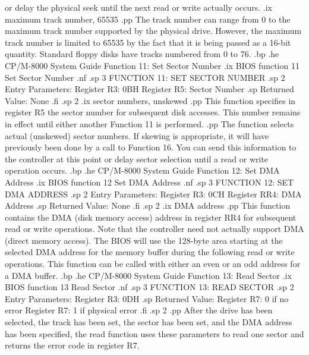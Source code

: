 or delay the physical seek until the next read or write actually occurs.
.ix maximum track number, 65535
.pp
The track number can range from 0 to the maximum track number supported
by the physical drive.  However, the maximum track number is limited
to 65535 by the fact that it is being passed as a 16-bit quantity.
Standard floppy disks have tracks numbered from 0 to 76.
.bp
.he CP/M-8000 System Guide             Function 11:  Set Sector Number
.ix BIOS function 11 Set Sector Number
.nf
.sp 3
                 FUNCTION 11:  SET SECTOR NUMBER
.sp 2 
                 Entry Parameters:
                    Register R3: 0BH
                    Register R5: Sector Number
.sp
                 Returned   Value: None
.fi
.sp 2
.ix sector numbers, unskewed
.pp
This function specifies in register R5 the sector number for subsequent disk
accesses.  This number remains in effect until either another Function 11 is 
performed.
.pp
The function selects actual (unskewed) sector numbers.  If skewing is 
appropriate, it will have previously been done by a call to Function 16.
You can send this information to the controller at this point or delay sector 
selection until a read or write operation occurs.
.bp
.he CP/M-8000 System Guide               Function 12:  Set DMA Address
.ix BIOS function 12 Set DMA Address
.nf
.sp 3
                  FUNCTION 12:  SET DMA ADDRESS
.sp 2
                  Entry Parameters:
                     Register R3: 0CH
                     Register RR4: DMA Address
.sp
                  Returned   Value: None
.fi
.sp 2
.ix DMA address
.pp
This function contains the DMA (disk memory access) address in register
RR4 for subsequent read or write operations.  Note that the controller
need not actually support DMA (direct memory access).  The BIOS will use
the 128-byte area starting at the selected DMA address
for the memory buffer during the following read or write operations.
This function can be called with either
an even or an odd address for a DMA buffer.
.bp
.he CP/M-8000 System Guide                   Function 13:  Read Sector
.ix BIOS function 13 Read Sector
.nf
.sp 3
                    FUNCTION 13:  READ SECTOR
.sp 2 
              Entry Parameters:    
                 Register R3: 0DH
.sp
              Returned   Value:  
                 Register R7: 0 if no error
                 Register R7: 1 if physical error
.fi
.sp 2
.pp
After the drive has been selected, the track has been set, the sector has
been set, and the DMA address has been specified, the read function uses
these parameters to read one sector and returns the error code
in register R7.
